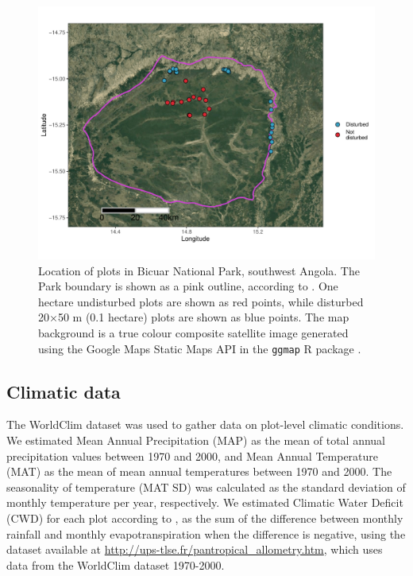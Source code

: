 \documentclass[diversity,article,submit,moreauthors,pdftex]{Definitions/mdpi}
\begin{document}
\begin{figure}[H]
\centering
	\includegraphics[width=\textwidth]{img/bicuar_map}
	\caption{Location of plots in Bicuar National Park, southwest Angola. The Park boundary is shown as a pink outline, according to \citet{WDPA2019}. One hectare undisturbed plots are shown as red points, while disturbed 20$\times$50 m (0.1 hectare) plots are shown as blue points. The map background is a true colour composite satellite image generated using the Google Maps Static Maps API in the \texttt{ggmap} R package \citep{ggmap}.}
	\label{bicuar_map}
\end{figure}

\subsection{Climatic data}

The WorldClim dataset \citep{Fick2017} was used to gather data on plot-level climatic conditions. We estimated Mean Annual Precipitation (MAP) as the mean of total annual precipitation values between 1970 and 2000, and Mean Annual Temperature (MAT) as the mean of mean annual temperatures between 1970 and 2000. The seasonality of temperature (MAT SD) was calculated as the standard deviation of monthly temperature per year, respectively. We estimated Climatic Water Deficit (CWD) for each plot according to \citep{Chave2014}, as the sum of the difference between monthly rainfall and monthly evapotranspiration when the difference is negative, using the dataset available at \url{http://ups-tlse.fr/pantropical_allometry.htm}, which uses data from the WorldClim dataset 1970-2000.
\end{document}
